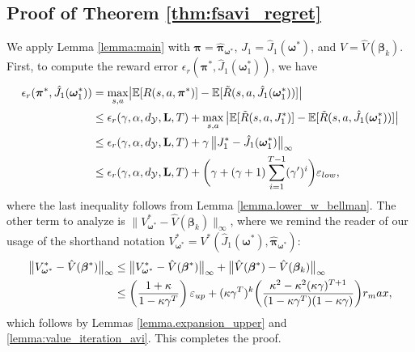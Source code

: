 \documentclass[11pt, notitlepage]{article}
\newcommand{\E}{\mathbb{E}}
\newcommand{\1}{\mathbbm{1}}
\begin{document}
\subsection{Proof of Theorem \ref{thm:fsavi_regret}}
\label{sec:proof_fsavi_regret}
We apply Lemma \ref{lemma:main} with $\boldsymbol{\pi} = \hat{\boldsymbol{\pi}}_{\boldsymbol{\omega}^*}$, $J_1 = \hat{J}_1(\boldsymbol{\omega}^*)$, and $V = \hat{V}(\boldsymbol{\beta}_k)$.
First, to compute the reward error $\epsilon_r(\boldsymbol{\pi}^*, \hat{J}_1(\boldsymbol{\omega}_1^*))$, we have
\begin{align*}
\epsilon_r(\boldsymbol{\pi}^*, \hat{J}_1(\boldsymbol{\omega}_1^*)) &= \max_{s,a} \bigl|\E [R(s, a, \boldsymbol{\pi}^*)] - \E [\tilde{R}(s, a, \hat{J}_1(\boldsymbol{\omega}_1^*))] \bigr|\\
&\le \epsilon_r(\gamma,\alpha,d_\mathcal{Y},\mathbf{L},T) + \max_{s,a}\, \bigl|\E [\tilde{R}(s, a, J_1^*)] - \E [\tilde{R}(s, a, \hat{J}_1(\boldsymbol{\omega}_1^*))]\bigr|\\
&\le \epsilon_r(\gamma,\alpha,d_\mathcal{Y},\mathbf{L},T) + \gamma \, \bigl \|J_1^* -\hat{J}_1(\boldsymbol{\omega}_1^*) \bigr\|_\infty\\
&\le \epsilon_r(\gamma,\alpha,d_\mathcal{Y},\mathbf{L},T) +  \biggl(\gamma + (\gamma+1) 
\sum_{i=1}^{T-1}(\gamma')^i\biggr) \varepsilon_{\textnormal{low}},
\end{align*}
where the last inequality follows from Lemma \ref{lemma.lower_w_bellman}. The other term to analyze is $\bigl \| V^*_{\boldsymbol{\omega}^*} - \hat{V}(\boldsymbol{\beta}_k) \bigr\|_\infty$, where we remind the reader of our usage of the shorthand notation $V^*_{\boldsymbol{\omega}^*} = V^*(\hat{J}_1(\boldsymbol{\omega}^*),\hat{\boldsymbol{\pi}}_{\boldsymbol{\omega}^*})$:
\begin{align*}
    \bigl \|V^*_{\boldsymbol{\omega}^*} - \hat{V}(\boldsymbol{\beta}^*) \bigr\|_\infty 
    &\le \bigl \| V^*_{\boldsymbol{\omega}^*} - \hat{V}(\boldsymbol{\beta}^*) \bigr\|_\infty + \bigl \| \hat{V}(\boldsymbol{\beta}^*) - \hat{V}(\boldsymbol{\beta}_k) \bigr\|_\infty\\
    &\le \biggl(\frac{1 + \kappa}{1- \kappa \gamma^T} \biggr)\,\varepsilon_{\textnormal{up}} + (\kappa \gamma^T)^k \biggl( \frac{\kappa^2 - \kappa^2 (\kappa\gamma)^{T+1}}{(1-\kappa \gamma^T) (1-\kappa\gamma)} \biggr) r_\textnormal{max},
\end{align*}
which follows by Lemmas \ref{lemma.expansion_upper} and \ref{lemma:value_iteration_avi}. This completes the proof.







	
\end{document}

